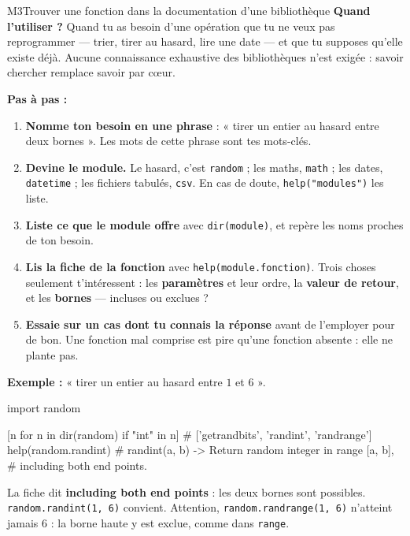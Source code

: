 \begin{fichemethode}{M3}{Trouver une fonction dans la documentation d'une bibliothèque}
\textbf{Quand l'utiliser ?} Quand tu as besoin d'une opération que tu ne veux pas
reprogrammer — trier, tirer au hasard, lire une date — et que tu supposes qu'elle existe
déjà. Aucune connaissance exhaustive des bibliothèques n'est exigée : savoir chercher
remplace savoir par cœur.

\textbf{Pas à pas :}
\begin{enumerate}
  \item \textbf{Nomme ton besoin en une phrase} : « tirer un entier au hasard entre deux
    bornes ». Les mots de cette phrase sont tes mots-clés.
  \item \textbf{Devine le module.} Le hasard, c'est \lstinline{random} ; les maths,
    \lstinline{math} ; les dates, \lstinline{datetime} ; les fichiers tabulés,
    \lstinline{csv}. En cas de doute, \lstinline{help("modules")} les liste.
  \item \textbf{Liste ce que le module offre} avec \lstinline{dir(module)}, et repère les
    noms proches de ton besoin.
  \item \textbf{Lis la fiche de la fonction} avec \lstinline{help(module.fonction)}. Trois
    choses seulement t'intéressent : les \textbf{paramètres} et leur ordre, la
    \textbf{valeur de retour}, et les \textbf{bornes} — incluses ou exclues ?
  \item \textbf{Essaie sur un cas dont tu connais la réponse} avant de l'employer pour de
    bon. Une fonction mal comprise est pire qu'une fonction absente : elle ne plante pas.
\end{enumerate}

\textbf{Exemple :} « tirer un entier au hasard entre $1$ et $6$ ».

\begin{python}
import random

[n for n in dir(random) if "int" in n]
# ['getrandbits', 'randint', 'randrange']
help(random.randint)
# randint(a, b) -> Return random integer in range [a, b],
#                  including both end points.
\end{python}

La fiche dit \textbf{including both end points} : les deux bornes sont possibles.
\lstinline{random.randint(1, 6)} convient. Attention, \lstinline{random.randrange(1, 6)}
n'atteint jamais $6$ : la borne haute y est exclue, comme dans \lstinline{range}.


\end{fichemethode}
